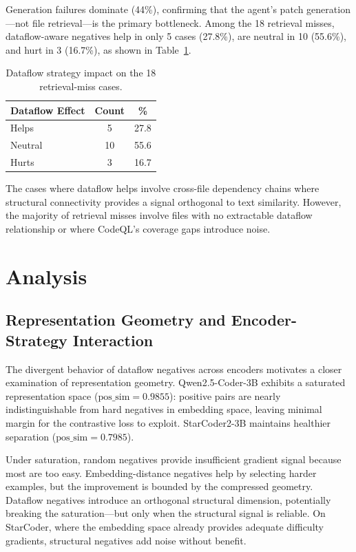 \documentclass[11pt,a4paper]{article}
\begin{document}
Generation failures dominate (44\%), confirming that the agent's patch generation---not file retrieval---is the primary bottleneck. Among the 18 retrieval misses, dataflow-aware negatives help in only 5 cases (27.8\%), are neutral in 10 (55.6\%), and hurt in 3 (16.7\%), as shown in Table~\ref{tab:dataflow_impact}.

\begin{table}[t]
\centering
\small
\begin{tabular}{lcc}
\toprule
\textbf{Dataflow Effect} & \textbf{Count} & \textbf{\%} \\
\midrule
Helps & 5 & 27.8 \\
Neutral & 10 & 55.6 \\
Hurts & 3 & 16.7 \\
\bottomrule
\end{tabular}
\caption{Dataflow strategy impact on the 18 retrieval-miss cases.}
\label{tab:dataflow_impact}
\end{table}

The cases where dataflow helps involve cross-file dependency chains where structural connectivity provides a signal orthogonal to text similarity. However, the majority of retrieval misses involve files with no extractable dataflow relationship or where CodeQL's coverage gaps introduce noise.

\section{Analysis}
\label{sec:analysis}

\subsection{Representation Geometry and Encoder-Strategy Interaction}

The divergent behavior of dataflow negatives across encoders motivates a closer examination of representation geometry. Qwen2.5-Coder-3B exhibits a saturated representation space ($\text{pos\_sim} = 0.9855$): positive pairs are nearly indistinguishable from hard negatives in embedding space, leaving minimal margin for the contrastive loss to exploit. StarCoder2-3B maintains healthier separation ($\text{pos\_sim} = 0.7985$).

Under saturation, random negatives provide insufficient gradient signal because most are too easy. Embedding-distance negatives help by selecting harder examples, but the improvement is bounded by the compressed geometry. Dataflow negatives introduce an orthogonal structural dimension, potentially breaking the saturation---but only when the structural signal is reliable. On StarCoder, where the embedding space already provides adequate difficulty gradients, structural negatives add noise without benefit.
\end{document}
